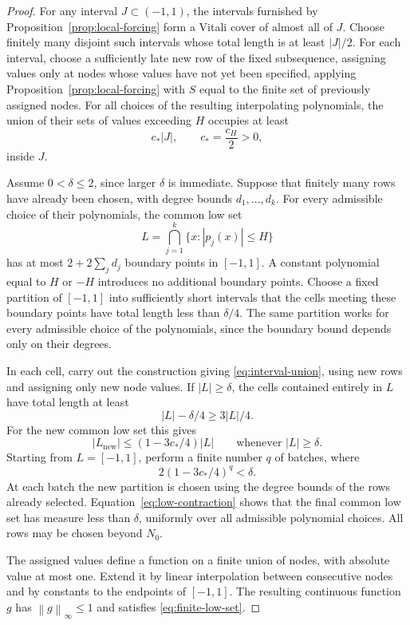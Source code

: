\documentclass[11pt]{article}
\theoremstyle{definition}
\numberwithin{equation}{section}
\newcommand{\norm}[1]{\left\lVert #1\right\rVert}
\begin{document}
\begin{proof}
For any interval \(J\subset(-1,1)\), the intervals furnished by
Proposition~\ref{prop:local-forcing} form a Vitali cover of almost all of \(J\).
Choose finitely many disjoint such intervals whose total length is
at least \(|J|/2\).
For each interval, choose a sufficiently late new row of the fixed
subsequence, assigning values only at nodes whose values have not
yet been specified, applying Proposition~\ref{prop:local-forcing}
with \(S\) equal to the finite set of previously assigned nodes.
For all choices of the resulting interpolating polynomials, the
union of their sets of values exceeding \(H\) occupies at least
\begin{equation}\label{eq:interval-union}
 c_*|J|,\qquad c_*=\frac{c_H}{2}>0,
\end{equation}
inside \(J\).

Assume \(0<\delta\le2\), since larger \(\delta\) is immediate.
Suppose that finitely many rows have already been chosen, with
degree bounds \(d_1,\ldots,d_k\).
For every admissible choice of their polynomials, the common low set
\[
 L=\bigcap_{j=1}^k\{x:|p_j(x)|\le H\}
\]
has at most \(2+2\sum_jd_j\) boundary points in \([-1,1]\).
A constant polynomial equal to \(H\) or \(-H\) introduces no
additional boundary points.
Choose a fixed partition of \([-1,1]\) into sufficiently short
intervals that the cells meeting these boundary points have total
length less than \(\delta/4\).
The same partition works for every admissible choice of the
polynomials, since the boundary bound depends only on their degrees.

In each cell, carry out the construction giving
\eqref{eq:interval-union}, using new rows and assigning only new
node values.
If \(|L|\ge\delta\), the cells contained entirely in \(L\) have
total length at least
\[
 |L|-\delta/4\ge3|L|/4.
\]
For the new common low set this gives
\begin{equation}\label{eq:low-contraction}
 |L_{\mathrm{new}}|
 \le (1-3c_*/4)|L|
 \qquad\text{whenever }|L|\ge\delta.
\end{equation}
Starting from \(L=[-1,1]\), perform a finite number \(q\) of batches,
where
\[
 2(1-3c_*/4)^q<\delta.
\]
At each batch the new partition is chosen using the degree bounds of
the rows already selected.
Equation~\eqref{eq:low-contraction} shows that the final common
low set has measure less than \(\delta\), uniformly over all
admissible polynomial choices.
All rows may be chosen beyond \(N_0\).

The assigned values define a function on a finite union of nodes,
with absolute value at most one. Extend it by linear interpolation
between consecutive nodes and by constants to the endpoints of
\([-1,1]\). The resulting continuous function \(g\) has
\(\norm{g}_\infty\le1\) and satisfies \eqref{eq:finite-low-set}.
\end{proof}
\end{document}
